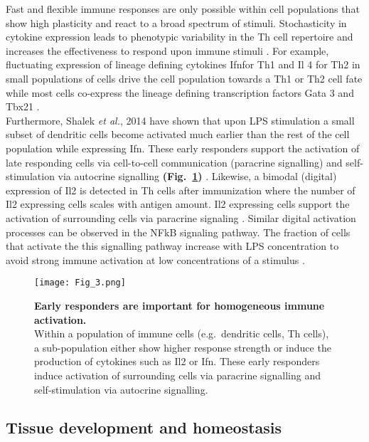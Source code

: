Fast and flexible immune responses are only possible within cell populations that show high plasticity and react to a broad spectrum of stimuli. Stochasticity in cytokine expression leads to phenotypic variability in the \Gls{Th} cell repertoire and increases the effectiveness to respond upon immune stimuli \citep{Schrom2017}. For example, fluctuating expression of lineage defining cytokines \gls{Ifn}\textgamma for Th1 and \Gls{Il} 4 for Th2 in small populations of cells drive the cell population towards a Th1 or Th2 cell fate while most cells co-express the lineage defining transcription factors \Gls{Gata} 3 and \Gls{Tbx21} \citep{Fang2013a, Antebi2013}.\\

Furthermore, Shalek \textit{et al.}, 2014 have shown that upon \Gls{LPS} stimulation a small subset of dendritic cells become activated much earlier than the rest of the cell population while expressing \gls{Ifn}\textbeta. These early responders support the activation of late responding cells via cell-to-cell communication (paracrine signalling) and self-stimulation via autocrine signalling \textbf{(Fig.~\ref{fig0:noise_immune})} \citep{Shalek2014}. Likewise, a bimodal (digital) expression of Il2 is detected in \gls{Th} cells after immunization where the number of Il2 expressing cells scales with antigen amount. Il2 expressing cells support the activation of surrounding cells via paracrine signaling \citep{Fuhrmann2016}. Similar digital activation processes can be observed in the \Gls{NFkB} signaling pathway. The fraction of cells that activate the this signalling pathway increase with LPS concentration to avoid strong immune activation at low concentrations of a stimulus \citep{Kellogg2015b}.

\begin{figure}[!h]
\centering
\texttt{[image: Fig\_3.png]}
\caption[Early responders are important for homogeneous immune activation]{\textbf{Early responders are important for homogeneous immune activation.}\\
Within a population of immune cells (e.g.~dendritic cells, \gls{Th} cells), a sub-population either show higher response strength or induce the production of cytokines such as Il2 or \gls{Ifn}\textbeta. These early responders induce activation of surrounding cells via paracrine signalling and self-stimulation via autocrine signalling.}
\label{fig0:noise_immune}
\end{figure}

\subsection{Tissue development and homeostasis}


